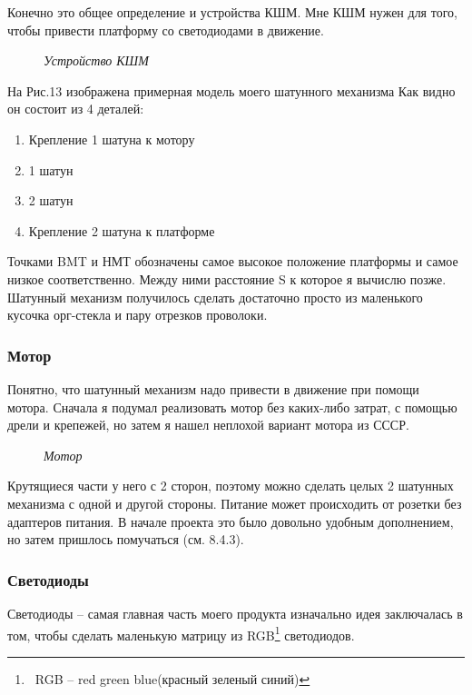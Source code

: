 \documentclass[a4paper, 12pt]{article}
\newcommand{\image}[3]{
	\begin{figure}[ht]
		\center{\texttt{[image: img/\#1]} }
		\caption{\textit{#3}}\end{figure}
}
\begin{document}
Конечно это общее определение и устройства КШМ. Мне КШМ нужен для того,
чтобы привести платформу со светодиодами в движение.

\image{Шатун.png}{230}{Устройство КШМ}

\newpage

На Рис.13 изображена примерная модель моего шатунного механизма
Как видно он состоит из 4 деталей:
\vspace{-7px}
\begin{enumerate}
  \item Крепление 1 шатуна к мотору
        \vspace{-10px}
  \item 1 шатун
        \vspace{-10px}
  \item 2 шатун
        \vspace{-10px}
  \item Крепление 2 шатуна к платформе
        \vspace{-10px}
\end{enumerate}
Точками BMT и НМТ обозначены самое высокое
положение платформы и самое низкое соответственно.
Между ними расстояние S к которое я вычислю позже.
Шатунный механизм получилось сделать достаточно просто
из маленького кусочка орг-стекла и пару отрезков проволоки.

\subsubsection{Мотор}

Понятно, что шатунный механизм надо привести в движение
при помощи мотора.
Сначала я подумал реализовать мотор без каких-либо затрат,
с помощью дрели и крепежей, но затем я нашел неплохой вариант
мотора из СССР.

\image{Мотор.jpg}{250}{Мотор}

Крутящиеся части у него с 2 сторон, поэтому можно сделать целых 2 шатунных механизма
с одной и другой стороны. Питание может происходить от розетки без адаптеров питания.
В начале проекта это было довольно удобным дополнением, но затем пришлось помучаться
(см. 8.4.3).

\newpage
\subsubsection{Светодиоды}

Светодиоды -- самая главная часть моего продукта
изначально идея заключалась в том, чтобы сделать маленькую
матрицу из RGB\footnote{\ RGB -- red green blue(красный зеленый синий)} светодиодов.
\end{document}
